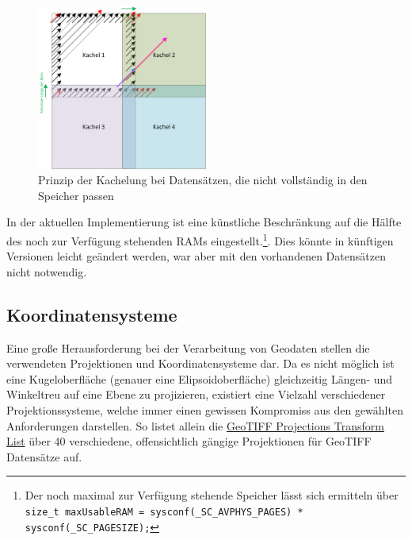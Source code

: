 \documentclass[10pt,a4paper]{report}
\begin{document}
\begin{figure}[ht]
\centering
	\includegraphics[width=0.5\textwidth]{../Vorgehensweise/drawings/UeberlappungKacheln.png}
	\caption{Prinzip der Kachelung bei Datensätzen, die nicht vollständig in den Speicher passen}
	\label{kachelung}
\end{figure}


In der aktuellen Implementierung ist eine künstliche Beschränkung auf die Hälfte des noch zur Verfügung stehenden RAMs eingestellt.\footnote{Der noch maximal zur Verfügung stehende Speicher lässt sich ermitteln über \texttt{size\_t maxUsableRAM = sysconf(\_SC\_AVPHYS\_PAGES) * sysconf(\_SC\_PAGESIZE);}}. Dies könnte in künftigen Versionen leicht geändert werden, war aber mit den vorhandenen Datensätzen nicht notwendig.

\subsection{Koordinatensysteme}

Eine große Herausforderung bei der Verarbeitung von Geodaten stellen die verwendeten Projektionen und Koordinatensysteme dar. Da es nicht möglich ist eine Kugeloberfläche (genauer eine Elipsoidoberfläche) gleichzeitig Längen- und Winkeltreu auf eine Ebene zu projizieren, existiert eine Vielzahl verschiedener Projektionssysteme, welche immer einen gewissen Kompromiss aus den gewählten Anforderungen darstellen. So listet allein die \href{http://geotiff.maptools.org/proj_list/}{GeoTIFF Projections Transform List} über 40 verschiedene, offensichtlich gängige Projektionen für GeoTIFF Datensätze auf.
\end{document}
